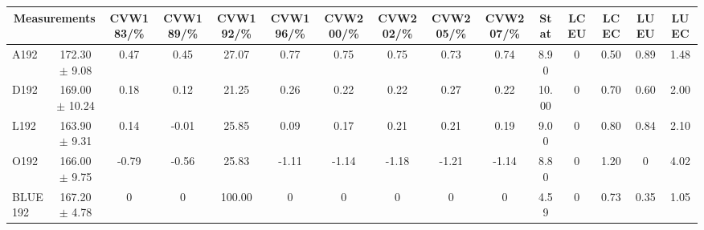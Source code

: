 \begin{table}[H]
\scriptsize
\begin{center}
\renewcommand{\arraystretch}{1.1}
\begin{tabular}{|lc|c|c|c|c|c|c|c|c|ccccc|}
\hline
\multicolumn{2}{|c|}{Measurements} & CVW{\tiny 183}/\%  & CVW{\tiny 189}/\%  & CVW{\tiny 192}/\%  & CVW{\tiny 196}/\%  & CVW{\tiny 200}/\%  & CVW{\tiny 202}/\%  & CVW{\tiny 205}/\%  & CVW{\tiny 207}/\%  & {\tiny Stat} & {\tiny LCEU} & {\tiny LCEC} & {\tiny LUEU} & {\tiny LUEC}\\
\hline
A192 &     172.30 $\pm$       9.08 &       0.47 &       0.45 &      27.07 &       0.77 &       0.75 &       0.75 &       0.73 &       0.74 &       8.90 &  0 &       0.50 &       0.89 &       1.48\\
D192 &     169.00 $\pm$      10.24 &       0.18 &       0.12 &      21.25 &       0.26 &       0.22 &       0.22 &       0.27 &       0.22 &      10.00 &  0 &       0.70 &       0.60 &       2.00\\
L192 &     163.90 $\pm$       9.31 &       0.14 &      -0.01 &      25.85 &       0.09 &       0.17 &       0.21 &       0.21 &       0.19 &       9.00 &  0 &       0.80 &       0.84 &       2.10\\
O192 &     166.00 $\pm$       9.75 &      -0.79 &      -0.56 &      25.83 &      -1.11 &      -1.14 &      -1.18 &      -1.21 &      -1.14 &       8.80 &  0 &       1.20 &  0 &       4.02\\
\hline
BLUE {\tiny 192} &     167.20 $\pm$       4.78 &  0 &  0 &     100.00 &  0 &  0 &  0 &  0 &  0 &       4.59 &  0 &       0.73 &       0.35 &       1.05\\
\hline
\end{tabular}
\renewcommand{\arraystretch}{1}
\end{center}
\end{table}
\vspace*{-0.5cm}
